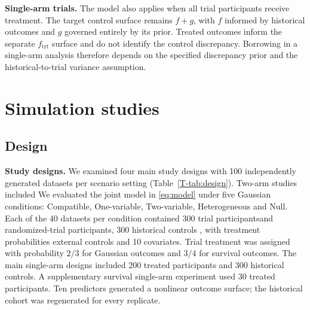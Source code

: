 \documentclass[11pt]{article}
\theoremstyle{remark}\newtheorem{remark}{Remark}[section]
\providecommand{\DIFaddtex}[1]{{\protect\color{blue} \sf #1}} %
\providecommand{\DIFdeltex}[1]{{\protect\color{red} \scriptsize #1}} %
\providecommand{\DIFaddbegin}{} %
\providecommand{\DIFaddend}{} %
\providecommand{\DIFdelbegin}{} %
\providecommand{\DIFdelend}{} %
\providecommand{\DIFadd}[1]{\texorpdfstring{\DIFaddtex{#1}}{#1}} %
\providecommand{\DIFdel}[1]{\texorpdfstring{\DIFdeltex{#1}}{}} %
\begin{document}
\DIFdelbegin %
\DIFdel{\textbf{Single-arm trials.}
The model also applies when all trial participants receive treatment. The target control surface remains $f+g$, with $f$ informed by historical outcomes and $g$ governed entirely by its prior. Treated outcomes inform the separate $f_{\mathrm{trt}}$ surface and do not identify the control discrepancy. Borrowing in a single-arm analysis therefore depends on the specified discrepancy prior and the historical-to-trial variance assumption.
}%

\section{\DIFdel{Simulation studies}}
\addtocounter{section}{-1}%
\subsection{\DIFdel{Design}}
\addtocounter{subsection}{-1}%
\DIFdel{\textbf{Study designs.}
We examined four main study designs with 100 independently generated datasets per scenario setting (Table~\ref{T-tab:design}). Two-arm studies included }\DIFdelend \DIFaddbegin \DIFadd{We evaluated the joint model in \eqref{eq:model} under five Gaussian conditions: Compatible, One-variable, Two-variable, Heterogeneous and Null. Each of the 40 datasets per condition contained }\DIFaddend 300 \DIFdelbegin \DIFdel{trial participantsand }\DIFdelend \DIFaddbegin \DIFadd{randomized-trial participants, }\DIFaddend 300 \DIFdelbegin \DIFdel{historical controls , with treatment probabilities }\DIFdelend \DIFaddbegin \DIFadd{external controls and 10 covariates. Trial treatment was assigned with probability }\DIFaddend $2/3$\DIFdelbegin \DIFdel{for Gaussian outcomes and $3/4$ for survival outcomes. The main single-arm designs included 200 treated participants and 300 historical controls. A supplementary survival single-arm experiment used 30 treated participants.
Ten predictors generated a nonlinear outcome surface; the historical cohort was regenerated for every replicate.
}%
\end{document}

